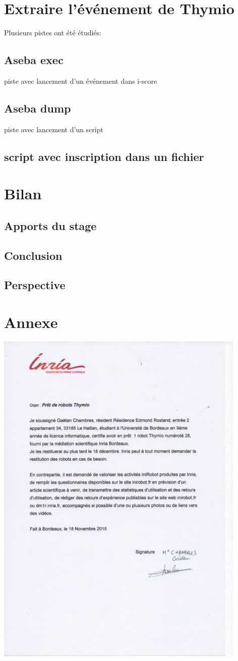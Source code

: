 \documentclass[a4paper, 12pt]{report}
\begin{document}
\chapter{Extraire l'événement de Thymio}
Plusieurs pistes ont été étudiés:
\section{Aseba exec}
piste avec lancement d'un événement dans i-score
\section{Aseba dump}
piste avec lancement d'un script
\section{script avec inscription dans un fichier}



\chapter{Bilan}
\section{Apports du stage}
\section{Conclusion}
\section{Perspective}


\nocite{*}

\chapter{Annexe}
\includegraphics[width=0.9\textwidth]{pret.png}
\end{document}
